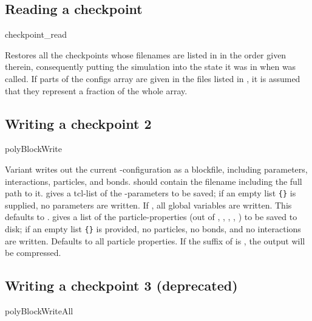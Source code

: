 \subsection{Reading a checkpoint}
\begin{essyntax}
  checkpoint_read 
\end{essyntax}
Restores all the checkpoints whose filenames are listed in
 in the order given therein, consequently putting the
simulation into the state it was in when  was
called. If parts of the configs array are given in the files listed in
, it is assumed that they represent a fraction of the
whole array.

\subsection{Writing a checkpoint 2}
\begin{essyntax}
   polyBlockWrite  
   
\end{essyntax}

Variant  writes out the current \es-configuration as a
blockfile, including parameters, interactions, particles, and bonds.
 should contain the filename including the full path to it.
 gives a tcl-list of the \es-parameters to be saved;
if an empty list \verb!{}! is supplied, no parameters are written.  If
, all global variables are written. This defaults to
.  gives a list of the particle-properties
(out of , , , , ) to be saved
to disk; if an empty list \verb!{}! is provided, no particles, no
bonds, and no interactions are written.  Defaults to all particle
properties.  If the suffix of  is , the output will
be compressed.

\subsection{Writing a checkpoint 3 (deprecated)}
\begin{essyntax}
   polyBlockWriteAll  
  
\end{essyntax}

